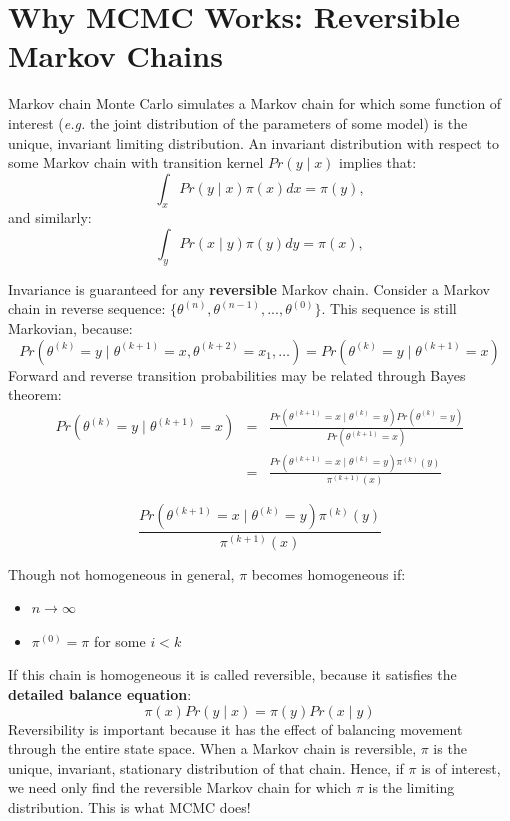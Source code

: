 
\hypertarget{reversible-markov-chains}{}
\section*{Why MCMC Works: Reversible Markov Chains}

Markov chain Monte Carlo simulates a Markov chain for which some function of interest (\emph{e.g.} the joint distribution of the parameters of some model) is the unique, invariant limiting distribution. An invariant distribution with respect to some Markov chain with transition kernel $Pr(y \mid x)$ implies that:
\[
\int_x Pr(y \mid x) \pi(x) dx = \pi(y),
\]
and similarly:
\[
\int_y Pr(x \mid y) \pi(y) dy = \pi(x),
\]

Invariance is guaranteed for any \textbf{reversible} Markov chain. Consider a Markov chain in reverse sequence: $\{\theta^{(n)},\theta^{(n-1)},...,\theta^{(0)}\}$. This sequence is still Markovian, because:
\[
Pr(\theta^{(k)}=y \mid \theta^{(k+1)}=x,\theta^{(k+2)}=x_1,\ldots ) = Pr(\theta^{(k)}=y \mid \theta^{(k+1)}=x)
\]
Forward and reverse transition probabilities may be related through Bayes theorem:
\begin{eqnarray}
Pr(\theta^{(k)}=y \mid \theta^{(k+1)}=x) &=& \frac{Pr(\theta^{(k+1)}=x \mid \theta^{(k)}=y) Pr(\theta^{(k)}=y)}{Pr(\theta^{(k+1)}=x)} \nonumber \\
&=& \frac{Pr(\theta^{(k+1)}=x \mid \theta^{(k)}=y) \pi^{(k)}(y)}{\pi^{(k+1)}(x)} \nonumber
\end{eqnarray}

\[
\frac{Pr(\theta^{(k+1)}=x \mid \theta^{(k)}=y) \pi^{(k)}(y)}{\pi^{(k+1)}(x)}
\]

\noindent Though not homogeneous in general, $\pi$ becomes homogeneous if:
\begin{itemize}
\item $n \rightarrow \infty$
\item $\pi^{(0)}=\pi$ for some $i < k$
\end{itemize}

\noindent If this chain is homogeneous it is called reversible, because it satisfies the \textbf{detailed balance equation}:
\[
\pi(x)Pr(y \mid x) = \pi(y) Pr(x \mid y)
\]
Reversibility is important because it has the effect of balancing movement through the entire state space. When a Markov chain is reversible, $\pi$ is the unique, invariant, stationary distribution of that chain.
Hence, if $\pi$ is of interest, we need only find the reversible Markov chain for which $\pi$ is the limiting distribution. This is what MCMC does!

